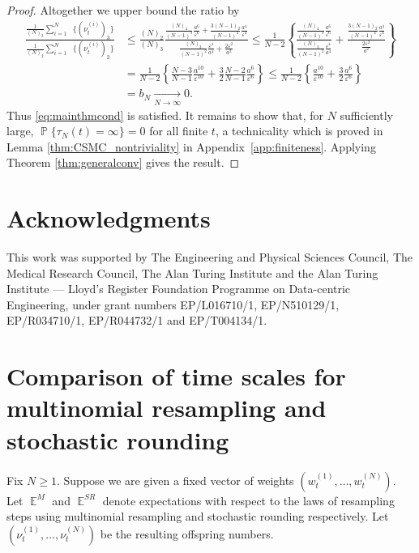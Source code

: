 \documentclass{article}
\theoremstyle{definition}
\DeclareMathOperator{\Prob}{\mathbb{P}}
\DeclareMathOperator{\E}{\mathbb{E}}
\DeclareMathOperator{\Et}{\mathbb{E}_t}
\newcommand{\1}[1]{\mathbbm{1}_{\{#1\}}}
\begin{document}
\begin{proof}
Altogether we upper bound the ratio by
\begin{align*}
\frac{\frac{1}{(N)_3} \sum_{i=1}^N \Et\{(\nu_t^{(i)})_3\}}{\frac{1}{(N)_2} \sum_{i=1}^N \Et\{(\nu_t^{(i)})_2\}}
&\leq \frac{(N)_2}{(N)_3} \frac{\frac{(N)_4}{(N-1)^3} \frac{a^6}{\varepsilon^6} + \frac{3(N-1)_2}{(N-1)^2} \frac{a^4}{\varepsilon^4}}{\frac{(N)_3}{(N-1)^2}\frac{\varepsilon^4}{a^4} + \frac{2\varepsilon^2}{a^2}}
\leq \frac{1}{N-2} \left\{ \frac{\frac{(N)_4}{(N-1)^3} \frac{a^6}{\varepsilon^6} }{\frac{(N)_3}{(N-1)^2}\frac{\varepsilon^4}{a^4} } 
+ \frac{ \frac{3(N-1)_2}{(N-1)^2} \frac{a^4}{\varepsilon^4}}{\frac{2\varepsilon^2}{a^2}} \right\} \\
&= \frac{1}{N-2} \left\{ \frac{N-3}{N-1} \frac{a^{10}}{\varepsilon^{10}} + \frac{3}{2} \frac{N-2}{N-1} \frac{a^6}{\varepsilon^6} \right\}
\leq \frac{1}{N-2} \left\{ \frac{a^{10}}{\varepsilon^{10}} + \frac{3}{2} \frac{a^6}{\varepsilon^6} \right\}\\
& = b_N \underset{N\to\infty}{\longrightarrow} 0.
\end{align*}
Thus \eqref{eq:mainthmcond} is satisfied. It remains to show that, for $N$ sufficiently large, $\Prob\{\tau_N(t) = \infty \}=0$ for all finite $t$, a technicality which is proved in Lemma \ref{thm:CSMC_nontriviality} in Appendix~\ref{app:finiteness}. Applying Theorem \ref{thm:generalconv} gives the result.
\end{proof}

\section*{Acknowledgments}
This work was supported by The Engineering and Physical Sciences Council, The Medical Research Council, The Alan Turing Institute and the Alan Turing Institute --- Lloyd's Register Foundation Programme on Data-centric Engineering, under grant numbers EP/L016710/1, EP/N510129/1, EP/R034710/1, EP/R044732/1 and EP/T004134/1.

\appendix
\section{Comparison of time scales for multinomial resampling and stochastic rounding}\label{app:timescales}

Fix $N\geq1$. Suppose we are given a fixed vector of weights $(w_t^{(1)},\dots,w_t^{(N)})$. Let $\E^{M}$ and $\E^{SR}$ denote expectations with respect to the laws of resampling steps using multinomial resampling and stochastic rounding respectively.
Let $(\nu_t^{(1)},\dots,\nu_t^{(N)})$ be the resulting offspring numbers. 
\end{document}
